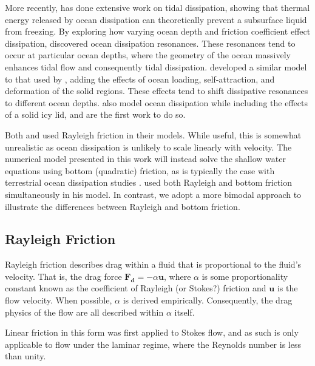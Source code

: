 More recently, \citet{tyler2008strong,tyler2009ocean,tyler2011tidal,tyler2014comparative} has done extensive work on tidal dissipation, showing that thermal energy released by ocean dissipation can theoretically prevent a subsurface liquid from freezing. By exploring how varying ocean depth and friction coefficient effect dissipation, \citet{tyler2011tidal} discovered ocean dissipation resonances. These resonances tend to occur at particular ocean depths, where the geometry of the ocean massively enhances tidal flow and consequently tidal dissipation. \citet{matsuyama2014tidal} developed a similar model to that used by \citet{tyler2011tidal}, adding the effects of ocean loading, self-attraction, and deformation of the solid regions. These effects tend to shift dissipative resonances to different ocean depths. \citet{kamata2015tidal} also model ocean dissipation while including the effects of a solid icy lid, and are the first work to do so.

Both \citet{tyler2011tidal} and \citet{matsuyama2014tidal} used Rayleigh friction in their models. While useful, this is somewhat unrealistic as ocean dissipation is unlikely to scale linearly with velocity. The numerical model presented in this work will instead solve the shallow water equations using bottom (quadratic) friction, as is typically the case with terrestrial ocean dissipation studies \citep{taylor1920tidal,jeffreys1921tidal,egbert2001estimates,jayne2001parameterizing}. \citet{sears1995tidal} used both Rayleigh and bottom friction simultaneously in his model. In contrast, we adopt a more bimodal approach to illustrate the differences between Rayleigh and bottom friction. 

\subsection{Rayleigh Friction}

Rayleigh friction describes drag within a fluid that is proportional to the fluid's velocity. That is, the drag force $\bm{F_d} = -\alpha \bm{u}$, where $\alpha$ is some proportionality constant known as the coefficient of Rayleigh (or Stokes?) friction and $\bm{u}$ is the flow velocity. When possible, $\alpha$ is derived empirically. Consequently, the drag physics of the flow are all described within $\alpha$ itself.

Linear friction in this form was first applied to Stokes flow, and as such is only applicable to flow under the laminar regime, where the Reynolds number is less than unity.

